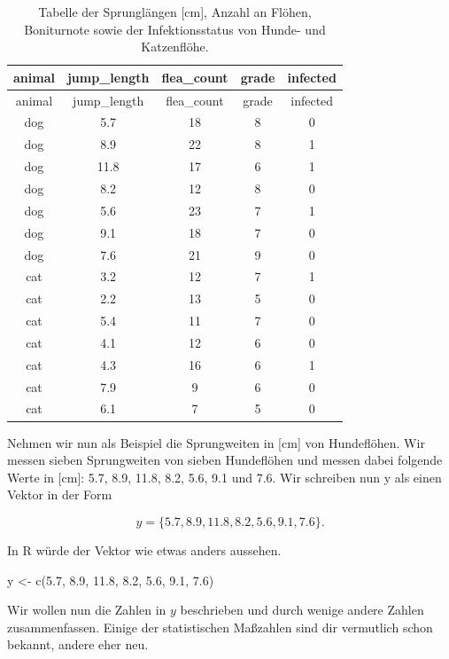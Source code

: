 \documentclass[
  letterpaper,
  DIV=11,
  oneside]{scrreport}
\newenvironment{Shaded}{\begin{snugshade}}{\end{snugshade}}
\newcommand{\FloatTok}[1]{\textcolor[rgb]{0.68,0.00,0.00}{#1}}
\newcommand{\FunctionTok}[1]{\textcolor[rgb]{0.28,0.35,0.67}{#1}}
\newcommand{\NormalTok}[1]{\textcolor[rgb]{0.00,0.23,0.31}{#1}}
\newcommand{\OtherTok}[1]{\textcolor[rgb]{0.00,0.23,0.31}{#1}}
\begin{document}
\hypertarget{tbl-dog-cat-desc}{}
\begin{longtable}[]{@{}ccccc@{}}
\caption{\label{tbl-dog-cat-desc}Tabelle der Sprunglängen {[}cm{]},
Anzahl an Flöhen, Boniturnote sowie der Infektionsstatus von Hunde- und
Katzenflöhe.}\tabularnewline
\toprule()
animal & jump\_length & flea\_count & grade & infected \\
\midrule()
\endfirsthead
\toprule()
animal & jump\_length & flea\_count & grade & infected \\
\midrule()
\endhead
dog & 5.7 & 18 & 8 & 0 \\
dog & 8.9 & 22 & 8 & 1 \\
dog & 11.8 & 17 & 6 & 1 \\
dog & 8.2 & 12 & 8 & 0 \\
dog & 5.6 & 23 & 7 & 1 \\
dog & 9.1 & 18 & 7 & 0 \\
dog & 7.6 & 21 & 9 & 0 \\
cat & 3.2 & 12 & 7 & 1 \\
cat & 2.2 & 13 & 5 & 0 \\
cat & 5.4 & 11 & 7 & 0 \\
cat & 4.1 & 12 & 6 & 0 \\
cat & 4.3 & 16 & 6 & 1 \\
cat & 7.9 & 9 & 6 & 0 \\
cat & 6.1 & 7 & 5 & 0 \\
\bottomrule()
\end{longtable}

Nehmen wir nun als Beispiel die Sprungweiten in {[}cm{]} von
Hundeflöhen. Wir messen sieben Sprungweiten von sieben Hundeflöhen und
messen dabei folgende Werte in {[}cm{]}: 5.7, 8.9, 11.8, 8.2, 5.6, 9.1
und 7.6. Wir schreiben nun y als einen Vektor in der Form

\[
y = \{5.7, 8.9, 11.8, 8.2, 5.6, 9.1, 7.6\}.
\]

In R würde der Vektor wie etwas anders aussehen.

\begin{Shaded}
\begin{Highlighting}[]
\NormalTok{y }\OtherTok{\textless{}{-}} \FunctionTok{c}\NormalTok{(}\FloatTok{5.7}\NormalTok{, }\FloatTok{8.9}\NormalTok{, }\FloatTok{11.8}\NormalTok{, }\FloatTok{8.2}\NormalTok{, }\FloatTok{5.6}\NormalTok{, }\FloatTok{9.1}\NormalTok{, }\FloatTok{7.6}\NormalTok{) }
\end{Highlighting}
\end{Shaded}

Wir wollen nun die Zahlen in \(y\) beschrieben und durch wenige andere
Zahlen zusammenfassen. Einige der statistischen Maßzahlen sind dir
vermutlich schon bekannt, andere eher neu.
\end{document}
